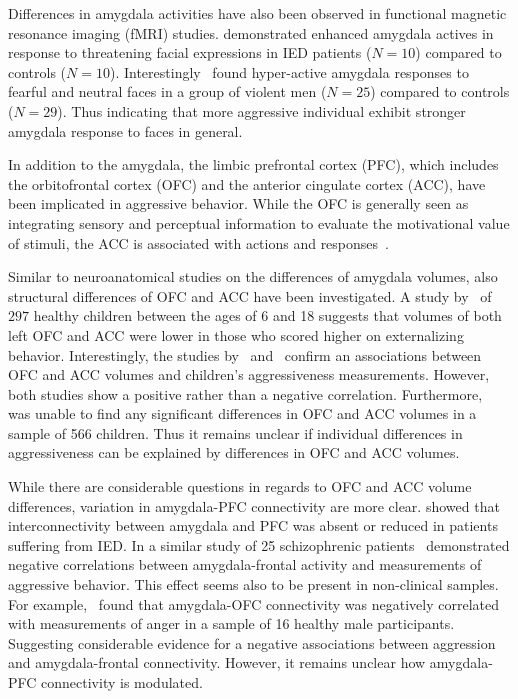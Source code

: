 Differences in amygdala activities have also been observed in functional magnetic resonance imaging (fMRI) studies.
\citet{Coccaro2007} demonstrated enhanced amygdala actives in response to threatening facial expressions in IED patients ($N=10$) compared to controls ($N=10$).
Interestingly~\citet{Bobes2013} found hyper-active amygdala responses to fearful and neutral faces in a group of violent men ($N=25$) compared to controls ($N=29$). 
Thus indicating that more aggressive individual exhibit stronger amygdala response to faces in general.

In addition to the amygdala, the limbic prefrontal cortex (PFC), which includes the orbitofrontal cortex (OFC) and the anterior cingulate cortex (ACC), have been implicated in aggressive behavior.
While the OFC is generally seen as integrating sensory and perceptual information to evaluate the motivational value of stimuli, the ACC is associated with actions and responses~\cite{Rudebeck2014,Walton2007}.

Similar to neuroanatomical studies on the differences of amygdala volumes, also structural differences of OFC and ACC have been investigated.
A study by~\citet{Ameis2014} of $297$ healthy children between the ages of 6 and 18 suggests that volumes of both left OFC and ACC were lower in those who scored higher on externalizing behavior.
Interestingly, the studies by~\citet{Ducharme2011} and~\citet{Boes2008} confirm an associations between OFC and ACC volumes and children's aggressiveness measurements.
However, both studies show a positive rather than a negative correlation.
Furthermore,~\citet{Thijssen2015} was unable to find any significant differences in OFC and ACC volumes in a sample of 566 children.
Thus it remains unclear if individual differences in aggressiveness can be explained by differences in OFC and ACC volumes.

While there are considerable questions in regards to OFC and ACC volume differences, variation in amygdala-PFC connectivity are more clear.
\citet{Coccaro2007} showed that interconnectivity between amygdala and PFC was absent or reduced in patients suffering from IED\@.
In a similar study of 25 schizophrenic patients~\citet{Hoptman2010} demonstrated negative correlations between amygdala-frontal activity and measurements of aggressive behavior.
This effect seems also to be present in non-clinical samples.
For example,~\citet{Fulwiler2012} found that amygdala-OFC connectivity was negatively correlated with measurements of anger in a sample of 16 healthy male participants. 
Suggesting considerable evidence for a negative associations between aggression and amygdala-frontal connectivity.
However, it remains unclear how amygdala-PFC connectivity is modulated.

